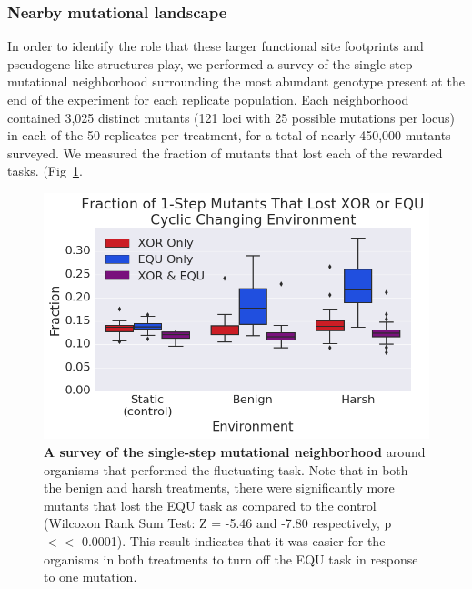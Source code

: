 \documentclass[PhD]{msu-thesis}
\begin{document}
\subsubsection{Nearby mutational landscape}

In order to identify the role that these larger functional site footprints and pseudogene-like structures play, we performed a survey of the single-step mutational neighborhood surrounding the most abundant genotype present at the end of the experiment for each replicate population. Each neighborhood contained 3,025 distinct mutants (121 loci with 25 possible mutations per locus) in each of the 50 replicates per treatment, for a total of nearly 450,000 mutants surveyed. We measured the fraction of mutants that lost each of the rewarded tasks. (Fig~\ref{fig:CCE_single_step}. 

	\begin{figure}[!h] %
	\includegraphics[trim={0.2cm 0 0 0.2cm},clip,width=0.75\columnwidth]{figures/CE/CCE_frac_1step__box.png}
	\caption{\textbf{A survey of the single-step mutational neighborhood} around organisms that performed the fluctuating task. Note that in both the benign and harsh treatments, there were significantly more mutants that lost the EQU task as compared to the control (Wilcoxon Rank Sum Test: Z = -5.46 and -7.80 respectively, p $<<$ 0.0001). This result indicates that it was easier for the organisms in both treatments to turn off the EQU task in response to one mutation. 
	}\label{fig:CCE_single_step}
	\end{figure}
\end{document}
